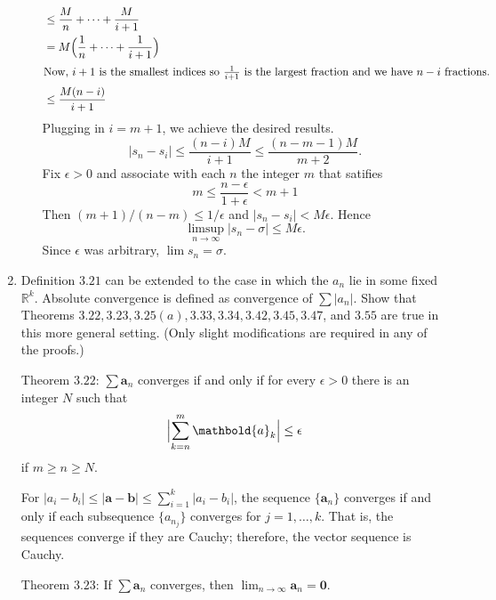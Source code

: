 \begin{enumerate}
\begin{enumerate}[label = (\alph*), ref = \theenumi{} (\alph*)]
{\begin{align*}
        & \leq \frac{M}{n} + \cdots + \frac{M}{i + 1}\\
        & = M\Bigl(\frac{1}{n} + \cdots + \frac{1}{i + 1}\Bigr)\\
        \intertext{Now, \(i + 1\) is the smallest indices so
        \(\frac{1}{i + 1}\) is the largest fraction and we have \(n - i\)
        fractions.}
        & \leq \frac{M(n - i)}{i + 1}
      \end{align*}
      Plugging in \(i = m + 1\), we achieve the desired results.
    }
    \[
    \lvert s_n - s_i\rvert\leq\frac{(n - i)M}{i + 1}\leq
    \frac{(n - m - 1)M}{m + 2}.
    \]
    Fix \(\epsilon > 0\) and associate with each \(n\) the integer \(m\) that
    satifies
    \[
    m\leq\frac{n - \epsilon}{1 + \epsilon} < m + 1
    \]
    Then \((m + 1)/(n - m)\leq 1/\epsilon\) and
    \(\lvert s_n - s_i\rvert < M\epsilon\).
    Hence
    \[
    \limsup_{n\to\infty}\lvert s_n - \sigma\rvert\leq M\epsilon.
    \]
    Since \(\epsilon\) was arbitrary, \(\lim s_n = \sigma\).
  \end{enumerate}
\item
  Definition \(3.21\) can be extended to the case in which the \(a_n\) lie in
  some fixed \(\mathbb{R}^k\).
  Absolute convergence is defined as convergence of \(\sum\lvert a_n\rvert\).
  Show that Theorems \(3.22,3.23,3.25(a),3.33,3.34,3.42,3.45,3.47\), and
  \(3.55\) are true in this more general setting.
  (Only slight modifications are required in any of the proofs.)
  \par\smallskip
  Theorem \(3.22\): \(\sum\mathbold{a}_n\) converges if and only if for every
  \(\epsilon > 0\) there is an integer \(N\) such that
  \[
  \Bigl\lvert\sum_{k = n}^m\mathbold{a}_k\Bigr\rvert\leq\epsilon
  \]
  if \(m\geq n\geq N\).
  \par\smallskip
  For \(\lvert a_i - b_i\rvert\leq\lvert\mathbold{a} - \mathbold{b}\rvert\leq
  \sum_{i = 1}^k\lvert a_i - b_i\rvert\), the sequence \(\{\mathbold{a}_n\}\)
  converges if and only if each subsequence \(\{a_{n_j}\}\) converges for
  \(j = 1,\ldots,k\).
  That is, the sequences converge if they are Cauchy; therefore, the vector
  sequence is Cauchy.
  \par\smallskip
  Theorem \(3.23\): If \(\sum\mathbold{a}_n\) converges, then
  \(\lim_{n\to\infty}\mathbold{a}_n = \mathbold{0}\).
  \par\smallskip
  

\end{enumerate}
